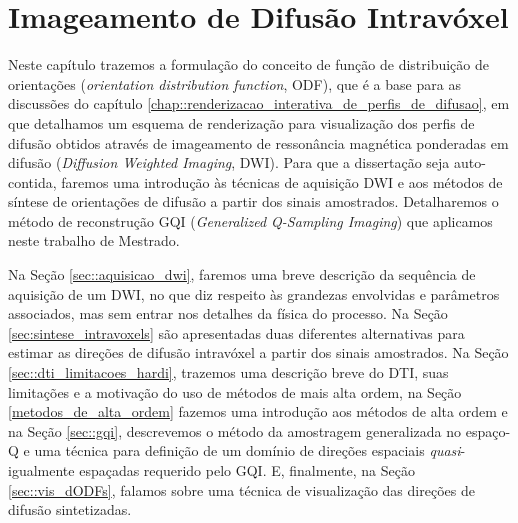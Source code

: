\documentclass[
    12pt,                %
    oneside,            %
    a4paper,            %
    english,            %
    french,                %
    spanish,            %
    brazil                %
    ]{abntex2}
\begin{document}




\chapter{Imageamento de Difusão Intravóxel}
\label{chapter::metodos_hardi}

Neste capítulo trazemos a formulação do conceito de função de distribuição de orientações (\textit{orientation distribution function}, ODF), que é a base para as discussões do capítulo \ref{chap::renderizacao_interativa_de_perfis_de_difusao}, em que detalhamos um esquema de renderização para visualização dos perfis de difusão obtidos através de imageamento de ressonância magnética ponderadas em difusão (\textit{Diffusion Weighted Imaging}, DWI). Para que a dissertação seja auto-contida, faremos uma introdução às técnicas de aquisição DWI e aos métodos de síntese de orientações de difusão a partir dos sinais amostrados. Detalharemos o método de reconstrução GQI (\textit{Generalized Q-Sampling Imaging}) que aplicamos neste trabalho de Mestrado.

Na Seção \ref{sec::aquisicao_dwi}, faremos uma breve descrição da sequência de aquisição de um DWI, no que diz respeito às grandezas envolvidas e parâmetros associados, mas sem entrar nos detalhes da física do processo. Na Seção \ref{sec:sintese_intravoxels} são apresentadas duas diferentes alternativas para estimar as direções de difusão intravóxel  a partir dos sinais amostrados. Na Seção \ref{sec::dti_limitacoes_hardi}, trazemos uma descrição breve do DTI, suas limitações e a motivação do uso de métodos de mais alta ordem, na Seção \ref{metodos_de_alta_ordem} fazemos uma introdução aos métodos de alta ordem e na Seção \ref{sec::gqi}, descrevemos o método da amostragem generalizada no espaço-Q e uma técnica para definição de um domínio de direções espaciais \textit{quasi}-igualmente espaçadas requerido pelo GQI. E, finalmente, na Seção \ref{sec::vis_dODFs}, falamos sobre uma técnica de visualização das direções de difusão sintetizadas. %
\end{document}
